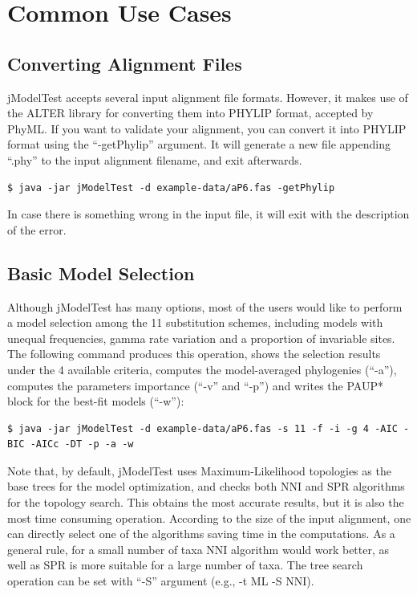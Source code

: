 \documentclass[10pt,twoside,a4paper]{article}
\begin{document}
\section{Common Use Cases}

\subsection{Converting Alignment Files}

jModelTest accepts several input alignment file formats. However, it makes use of the ALTER library for converting them into PHYLIP format, accepted by PhyML. If you want to validate your alignment, you can convert it into PHYLIP format using the ``-getPhylip'' argument. It will generate a new file appending ``.phy'' to the input alignment filename, and exit afterwards.

\begin{lstlisting}
$ java -jar jModelTest -d example-data/aP6.fas -getPhylip
\end{lstlisting}

In case there is something wrong in the input file, it will exit with the description of the error.

\subsection{Basic Model Selection}

Although jModelTest has many options, most of the users would like to perform a model selection among the 11 substitution schemes, including models with unequal frequencies, gamma rate variation and a proportion of invariable sites. The following command produces this operation, shows the selection results under the 4 available criteria, computes the model-averaged phylogenies (``-a''), computes the parameters importance (``-v'' and ``-p'') and writes the PAUP* block for the best-fit models (``-w''):

\begin{lstlisting}
$ java -jar jModelTest -d example-data/aP6.fas -s 11 -f -i -g 4 -AIC -BIC -AICc -DT -p -a -w
\end{lstlisting}

Note that, by default, jModelTest uses Maximum-Likelihood topologies as the base trees for the model optimization, and checks both NNI and SPR algorithms for the topology search. This obtains the most accurate results, but it is also the most time consuming operation. According to the size of the input alignment, one can directly select one of the algorithms saving time in the computations. As a general rule, for a small number of taxa NNI algorithm would work better, as well as SPR is more suitable for a large number of taxa. The tree search operation can be set with ``-S'' argument (e.g., -t ML -S NNI).
\end{document}
